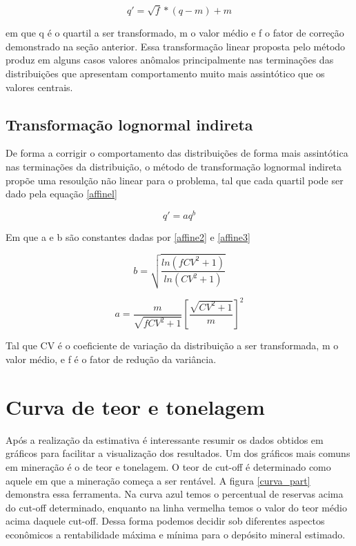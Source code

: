 \begin{equation}\label{affine}
q'= \sqrt{f}*(q-m) + m
\end{equation}

em que q é o quartil a ser transformado, m o valor médio e f o fator de correção demonstrado na seção anterior. Essa transformação linear proposta pelo método produz em alguns casos valores anômalos principalmente nas terminações das distribuições que apresentam comportamento muito mais assintótico que os valores centrais. 

\subsection{Transformação lognormal indireta}

De forma a corrigir o comportamento das distribuições de forma mais assintótica nas terminações da distribuição, o método de transformação lognormal indireta propõe uma resoulção não linear para o problema, tal que cada quartil pode ser dado pela equação \eqref{affinel}

\begin{equation}\label{affinel}
q'= aq^{b}
\end{equation}

Em que a e b são constantes dadas por \eqref{affine2} e \eqref{affine3}

\begin{equation}\label{affine2}
b = \sqrt{\frac{ln(fCV^2+1)}{ln(CV^2+1)}}
\end{equation}

\begin{equation}\label{affine3}
a = \frac{m}{\sqrt{f CV^2 + 1}} \left[\frac{\sqrt{CV^2+1}}{m}\right]^2
\end{equation}

Tal que CV é o coeficiente de variação da distribuição a ser transformada, m o valor médio, e f é o fator de redução da variância.

\section{Curva de teor e tonelagem}

Após a realização da estimativa é interessante resumir os dados obtidos em gráficos para facilitar a visualização dos resultados. Um dos gráficos mais comuns em mineração é o de teor e tonelagem. O  teor de cut-off é determinado como aquele em que a mineração começa a ser rentável. A figura \eqref{curva_part} demonstra essa ferramenta. Na curva azul temos o percentual de reservas acima do cut-off determinado, enquanto na linha vermelha temos o valor do teor médio acima daquele cut-off. Dessa forma podemos decidir sob diferentes aspectos econômicos a rentabilidade máxima e mínima para o depósito mineral estimado. 

